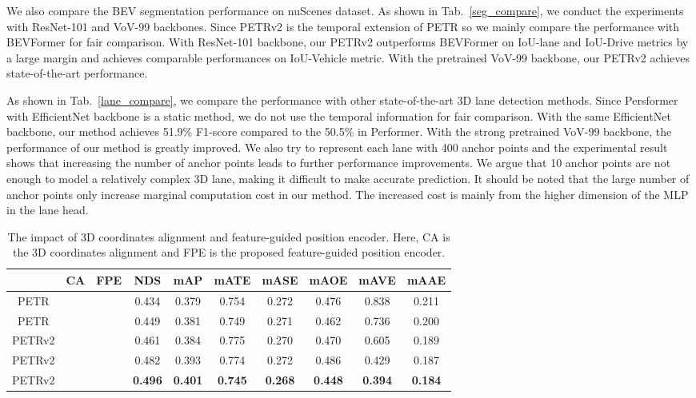 \documentclass[10pt,twocolumn,letterpaper]{article}
\begin{document}
We also compare the BEV segmentation performance on nuScenes dataset. As shown in Tab.~\ref{seg_compare}, we conduct the experiments with ResNet-101 and VoV-99 backbones. Since PETRv2 is the temporal extension of PETR so we mainly compare the performance with BEVFormer for fair comparison. With ResNet-101 backbone, our PETRv2 outperforms BEVFormer on IoU-lane and IoU-Drive metrics by a large margin and achieves comparable performances on IoU-Vehicle metric. With the pretrained VoV-99 backbone, our PETRv2 achieves state-of-the-art performance.


As shown in Tab.~\ref{lane_compare}, we compare the performance with other state-of-the-art 3D lane detection methods. Since Persformer~\cite{chen2022persformer} with EfficientNet backbone is a static method, we do not use the temporal information for fair comparison. With the same EfficientNet backbone, our method achieves 51.9\% F1-score compared to the 50.5\% in Performer. With the strong pretrained VoV-99 backbone, the performance of our method is greatly improved. We also try to represent each lane with 400 anchor points and the experimental result shows that increasing the number of anchor points leads to further performance improvements. We argue that 10 anchor points are not enough to model a relatively complex 3D lane, making it difficult to make accurate prediction. It should be noted that the large number of anchor points only increase marginal computation cost in our method. The increased cost is mainly from the higher dimension of the MLP in the lane head.






\begin{table*}[t!]
    \begin{center}
\caption{The impact of 3D coordinates alignment and feature-guided position encoder. Here, CA is the 3D coordinates alignment and FPE is the proposed feature-guided position encoder.}
    \label{ablation}
    \setlength{\tabcolsep}{5pt}
\begin{tabular}{c|cc|ccccccc}
        \hline
\quad\quad& \quad CA \quad &\quad FPE \quad\quad& NDS\quad & mAP\quad  & mATE& mASE& mAOE& mAVE & mAAE\\
\hline
PETR\quad& & &0.434 &0.379 &0.754 &0.272 &0.476 &0.838 &0.211\\ 
        PETR\quad& &&0.449 &0.381 &0.749 &0.271 &0.462 &0.736 &0.200\\ 
        \hline
PETRv2\quad& & &0.461 &0.384 &0.775 &0.270 &0.470 &0.605 &0.189\\
PETRv2\quad&\quad& &0.482 &0.393 &0.774 &0.272 &0.486 &0.429 &0.187 \\
        PETRv2\quad&\quad & &\textbf{0.496} &\textbf{0.401} &\textbf{0.745} &\textbf{0.268} &\textbf{0.448} &\textbf{0.394} &\textbf{0.184}\\
        \hline
        \end{tabular}






    \label{tab:ablation}
\end{center}
\vspace{-1.0em}
\end{table*}
\end{document}
